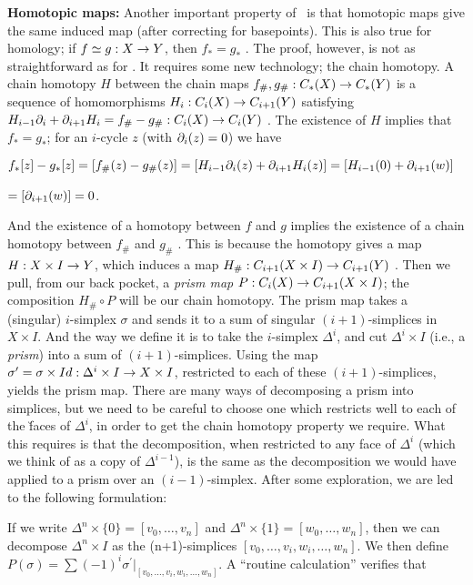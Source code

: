 \vfill
\eject

{\bf Homotopic maps:} Another important property of \mpu\ is that homotopic maps give the same
induced map (after correcting for basepoints). This is also true for homology;
if $f\simeq g:X\rightarrow Y$, then $f_*=g_*$ . The proof, however, is not as straightforward
as for \mpu. It requires some new technology; the chain homotopy.
A chain homotopy $H$ between the chain maps $f_\#,g_\#:C_*(X)\rightarrow C_*(Y)$ 
is a sequence of homomorphisms $H_i:C_i(X)\rightarrow C_{i+1}(Y)$ satisfying
$H_{i-1}\partial_i+\partial_{i+1}H_i = f_\#-g_\#:C_i(X)\rightarrow C_i(Y)$ . The existence of $H$
implies that $f_*=g_*$; for an $i$-cycle $z$ (with $\partial_i(z)=0$) we have

\ssk

$f_*[z]-g_*[z] = [f_\#(z)-g_\#(z)] = [H_{i-1}\partial_i(z)+\partial_{i+1}H_i(z)] = [H_{i-1}(0)+\partial_{i+1}(w)]$

$=[\partial_{i+1}(w)]=0$.

\ssk

And the existence of a homotopy between $f$ and $g$ implies the existence of a 
chain homotopy between $f_\#$ and $g_\#$ . This is because the homotopy 
gives a map $H:X\times I\rightarrow Y$, which induces a map $H_\#:C_{i+1}(X\times I)\rightarrow C_{i+1}(Y)$ .
Then we pull, from our back pocket, a {\it prism map}
$P:C_i(X)\rightarrow C_{i+1}(X\times I)$; the composition $H_\#\circ P$ will be our chain homotopy.
The prism map takes a (singular) $i$-simplex $\sigma$ and sends it to a sum of singular $(i+1)$-simplices
in $X\times I$. And the way we define it is to take the $i$-simplex $\Delta^i$, and cut
$\Delta^i\times I$ (i.e., a {\it prism}) into a sum of $(i+1)$-simplices. Using the
map $\sigma^\prime = \sigma\times Id : \Delta^i\times I\rightarrow X\times I$, 
restricted to each of these $(i+1)$-simplices,
yields the prism map. There are many ways of decomposing a prism into simplices,
but we need to be careful to choose one which restricts well to each of 
the \u{faces} of $\Delta^i$,
in order to get the chain homotopy property we require. What 
this requires is that the
decomposition, when restricted to any face of $\Delta^i$ (which we think of as a copy
of $\Delta^{i-1}$), is the same as the decomposition we would have applied to a prism over
an $(i-1)$-simplex. After some exploration, we are led to the following formulation:

\vfill
\eject

If we write $\Delta^n\times\{0\}=[v_0,\ldots ,v_n]$ and 
$\Delta^n\times\{1\}=[w_0,\ldots ,w_n]$, then we can decompose
$\Delta^n\times I$ as the (n+1)-simplices $[v_0,\ldots ,v_i,w_i,\ldots ,w_n]$. 
We then define $P(\sigma) = \sum (-1)^i \sigma^\prime|_{[v_0,\ldots ,v_i,w_i,\ldots ,w_n]}$.
A ``routine calculation'' verifies that 

